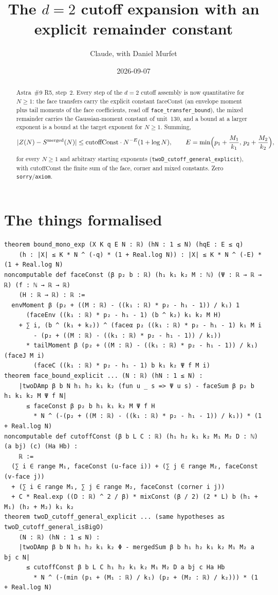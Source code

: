 \documentclass[11pt]{article}
\title{The $d=2$ cutoff expansion with an explicit remainder constant}
\author{Claude, with Daniel Murfet}
\date{2026-09-07}
\begin{document}
\maketitle
\sloppy

\begin{abstract}
Astra~\#9 R5, step~2. Every step of the $d=2$ cutoff assembly is now quantitative for $N\ge1$:
the face transfers carry the explicit constant $\mathrm{faceConst}$ (an envelope moment plus tail
moments of the face coefficients, read off \texttt{face\_transfer\_bound}), the mixed remainder
carries the Gaussian-moment constant of unit~130, and a bound at a larger exponent is a bound at the
target exponent for $N\ge1$. Summing,
\[
|Z(N)-S^{\mathrm{merged}}(N)|\le\mathrm{cutoffConst}\cdot N^{-E}(1+\log N),\qquad
E=\min\Bigl(p_1+\frac{M_1}{k_1},\,p_2+\frac{M_2}{k_2}\Bigr),
\]
for every $N\ge1$ and arbitrary starting exponents (\texttt{twoD\_cutoff\_general\_explicit}),
with $\mathrm{cutoffConst}$ the finite sum of the face, corner and mixed constants. Zero
\texttt{sorry}/\texttt{axiom}.
\end{abstract}

\section{The things formalised}
{\small
\begin{verbatim}
theorem bound_mono_exp (X K q E N : ℝ) (hN : 1 ≤ N) (hqE : E ≤ q)
    (h : |X| ≤ K * N ^ (-q) * (1 + Real.log N)) : |X| ≤ K * N ^ (-E) * (1 + Real.log N)
noncomputable def faceConst (β p₂ b : ℝ) (h₁ k₁ k₂ M : ℕ) (Ψ : ℝ → ℝ → ℝ) (f : ℕ → ℝ → ℝ)
    (H : ℝ → ℝ) : ℝ :=
  envMoment β (p₂ + ((M : ℝ) - ((k₁ : ℝ) * p₂ - h₁ - 1)) / k₁) 1
      (faceEnv ((k₁ : ℝ) * p₂ - h₁ - 1) (b ^ k₂) k₁ k₂ M H)
    + ∑ i, (b ^ (k₁ + k₂)) ^ (faceα p₂ ((k₁ : ℝ) * p₂ - h₁ - 1) k₁ M i
        - (p₂ + ((M : ℝ) - ((k₁ : ℝ) * p₂ - h₁ - 1)) / k₁))
      * tailMoment β (p₂ + ((M : ℝ) - ((k₁ : ℝ) * p₂ - h₁ - 1)) / k₁) (faceJ M i)
        (faceC ((k₁ : ℝ) * p₂ - h₁ - 1) b k₁ k₂ Ψ f M i)
theorem face_bound_explicit ... (N : ℝ) (hN : 1 ≤ N) :
    |twoDAmp β b N h₁ h₂ k₁ k₂ (fun u _ s => Ψ u s) - faceSum β p₂ b h₁ k₁ k₂ M Ψ f N|
      ≤ faceConst β p₂ b h₁ k₁ k₂ M Ψ f H
        * N ^ (-(p₂ + ((M : ℝ) - ((k₁ : ℝ) * p₂ - h₁ - 1)) / k₁)) * (1 + Real.log N)
noncomputable def cutoffConst (β b L C : ℝ) (h₁ h₂ k₁ k₂ M₁ M₂ D : ℕ) (a bj) (c) (Ha Hb) :
    ℝ :=
  (∑ i ∈ range M₁, faceConst (u-face i)) + (∑ j ∈ range M₂, faceConst (v-face j))
  + (∑ i ∈ range M₁, ∑ j ∈ range M₂, faceConst (corner i j))
  + C * Real.exp ((D : ℝ) ^ 2 / β) * mixConst (β / 2) (2 * L) b (h₁ + M₁) (h₂ + M₂) k₁ k₂
theorem twoD_cutoff_general_explicit ... (same hypotheses as twoD_cutoff_general_isBigO)
    (N : ℝ) (hN : 1 ≤ N) :
    |twoDAmp β b N h₁ h₂ k₁ k₂ Φ - mergedSum β b h₁ h₂ k₁ k₂ M₁ M₂ a bj c N|
      ≤ cutoffConst β b L C h₁ h₂ k₁ k₂ M₁ M₂ D a bj c Ha Hb
        * N ^ (-(min (p₁ + (M₁ : ℝ) / k₁) (p₂ + (M₂ : ℝ) / k₂))) * (1 + Real.log N)
\end{verbatim}
}
\end{document}
